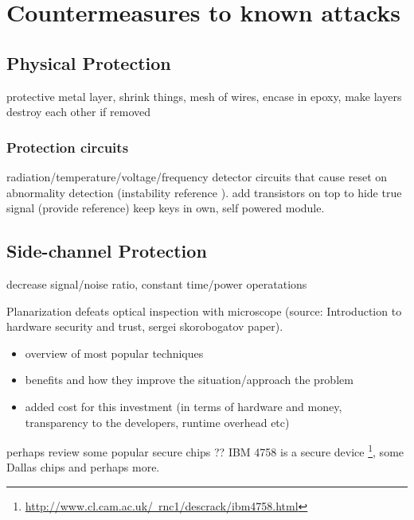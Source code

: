 \section{Countermeasures to known attacks}
\label{sec:defenses}
\subsection{Physical Protection}
protective metal layer, shrink things, mesh of wires, encase in epoxy, make layers destroy each other if removed
\subsubsection{Protection circuits}
radiation/temperature/voltage/frequency detector circuits that cause reset on abnormality detection (instability reference \citep{anderson:cautionary_note}). add transistors on top to hide true signal (provide reference)
 keep keys in own, self powered module.
\subsection{Side-channel Protection}
decrease signal/noise ratio, constant time/power operatations

Planarization defeats optical inspection with microscope (source: Introduction to hardware security and trust, sergei skorobogatov paper).\\
	\begin{itemize}
	\item overview of most popular techniques \\
	\item benefits and how they improve the situation/approach the problem
	\item added cost for this investment (in terms of hardware and money, transparency to the developers, runtime overhead etc)\\
	\end{itemize}
	
	perhaps review some popular secure chips ?? IBM 4758 is a secure device \footnote{\href{http://www.cl.cam.ac.uk/~rnc1/descrack/ibm4758.html}{http://www.cl.cam.ac.uk/~rnc1/descrack/ibm4758.html}}, some Dallas chips and perhaps more.